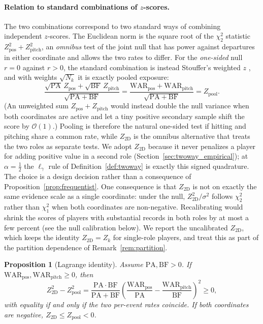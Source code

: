 \documentclass[11pt,letterpaper]{article}
\theoremstyle{plain}
\newtheorem{proposition}{Proposition}
\theoremstyle{definition}
\theoremstyle{remark}
\newcommand{\WAR}{\mathrm{WAR}}
\newcommand{\PA}{\mathrm{PA}}
\newcommand{\BF}{\mathrm{BF}}
\newcommand{\Zpos}{Z_{\mathrm{pos}}}
\newcommand{\Zpitch}{Z_{\mathrm{pitch}}}
\newcommand{\Zpool}{Z_{\mathrm{pool}}}
\newcommand{\Ztwoway}{Z_{\mathrm{2D}}}
\begin{document}
\paragraph{Relation to standard combinations of $z$-scores.} The two combinations correspond to two standard ways of combining independent $z$-scores. The Euclidean norm is the square root of the $\chi^2_2$ statistic $\Zpos^2 + \Zpitch^2$, an \emph{omnibus} test of the joint null that has power against departures in either coordinate and allows the two rates to differ. For the \emph{one-sided} null $r = 0$ against $r > 0$, the standard combination is instead Stouffer's weighted $z$ \cite{stouffer1949,liptak1958,whitlock2005}, and with weights $\sqrt{N_k}$ it is exactly pooled exposure:
\begin{equation}
    \frac{\sqrt{\PA}\,\Zpos + \sqrt{\BF}\,\Zpitch}{\sqrt{\PA + \BF}} = \frac{\WAR_{\mathrm{pos}} + \WAR_{\mathrm{pitch}}}{\sqrt{\PA + \BF}} = \Zpool .
\end{equation}
(An unweighted sum $\Zpos + \Zpitch$ would instead double the null variance when both coordinates are active and let a tiny positive secondary sample shift the score by $\mathcal{O}(1)$.) Pooling is therefore the natural one-sided test if hitting and pitching share a common rate, while $\Ztwoway$ is the omnibus alternative that treats the two roles as separate tests. We adopt $\Ztwoway$ because it never penalizes a player for adding positive value in a second role (Section~\ref{sec:twoway_empirical}); at $\alpha = \tfrac12$ the $\ell_\gamma$ rule of Definition~\ref{def:twoway} is exactly this signed quadrature. The choice is a design decision rather than a consequence of Proposition~\ref{prop:frequentist}. One consequence is that $\Ztwoway$ is not on exactly the same evidence scale as a single coordinate: under the null, $\Ztwoway^2/\sigma^2$ follows $\chi^2_2$ rather than $\chi^2_1$ when both coordinates are non-negative. Recalibrating would shrink the scores of players with substantial records in both roles by at most a few percent (see the null calibration below). We report the uncalibrated $\Ztwoway$, which keeps the identity $\Ztwoway = Z_k$ for single-role players, and treat this as part of the partition dependence of Remark~\ref{rem:partition}.

\begin{proposition}[Lagrange identity]
\label{prop:lagrange}
Assume $\PA, \BF > 0$. If $\WAR_{\mathrm{pos}}, \WAR_{\mathrm{pitch}} \ge 0$, then
\begin{equation}
    \label{eq:lagrange}
    \Ztwoway^2 - \Zpool^2 = \frac{\PA \cdot \BF}{\PA + \BF}\left(\frac{\WAR_{\mathrm{pos}}}{\PA} - \frac{\WAR_{\mathrm{pitch}}}{\BF}\right)^2 \ge 0,
\end{equation}
with equality if and only if the two per-event rates coincide. If both coordinates are negative, $\Ztwoway \le \Zpool < 0$.
\end{proposition}
\end{document}

